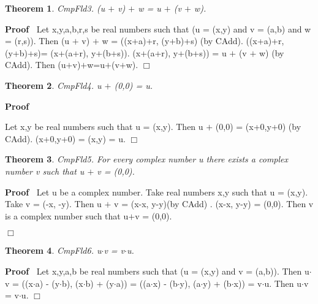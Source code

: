 \documentclass{article}
\newenvironment{forthel}{\begin{leftbar}}{\end{leftbar}}
\newenvironment{proof}{\noindent\textbf{Proof\ }}{\hspace*{\fill}$\Box$\medskip}
\newtheorem{theorem}{Theorem}
\newcommand{\cmul}{\cdot}
\newcommand{\cadd}{+}
\begin{document}
\begin{forthel}
\begin{theorem}
 CmpFld3. (u $\cadd$ v) $\cadd$ w = u $\cadd$ (v $\cadd$ w).
\end{theorem}\begin{proof}
 Let x,y,a,b,r,s be real numbers such that (u = (x,y) and v = (a,b) and w = (r,s)).
Then (u $\cadd$ v) $\cadd$ w = ((x+a)+r, (y+b)+s) (by CAdd). 
((x+a)+r, (y+b)+s)= (x+(a+r), y+(b+s)).
(x+(a+r), y+(b+s)) = u $\cadd$ (v $\cadd$ w) (by CAdd).
Then (u$\cadd$v)$\cadd$w=u$\cadd$(v$\cadd$w). 
\end{proof}


\begin{theorem}
 CmpFld4. u $\cadd$ (0,0) = u.
\end{theorem}\begin{proof}
 
Let x,y be real numbers such that u = (x,y). Then u $\cadd$ (0,0) = (x+0,y+0) (by CAdd). (x+0,y+0) = (x,y) = u. 
\end{proof}




\begin{theorem}
 CmpFld5. For every complex number u there exists a complex number v such that u $\cadd$ v = (0,0).
\end{theorem}\begin{proof}
 Let u be a complex number.
Take real numbers x,y such that u = (x,y). Take v = (-x, -y). Then  u $\cadd$ v = (x-x, y-y)(by CAdd) . (x-x, y-y) = (0,0). 
Then v is a complex number such that u$\cadd$v = (0,0).

\end{proof}


\begin{theorem}
 CmpFld6. u$\cmul$v = v$\cmul$u.
\end{theorem}\begin{proof}
 Let x,y,a,b be real numbers such that (u = (x,y) and v = (a,b)).
Then u$\cmul$v =  ((x$\cdot$a) - (y$\cdot$b), (x$\cdot$b) + (y$\cdot$a)) =  ((a$\cdot$x) - (b$\cdot$y), (a$\cdot$y) + (b$\cdot$x)) = v$\cmul$u. Then u$\cmul$v = v$\cmul$u. \end{proof}



\end{forthel}
\end{document}
